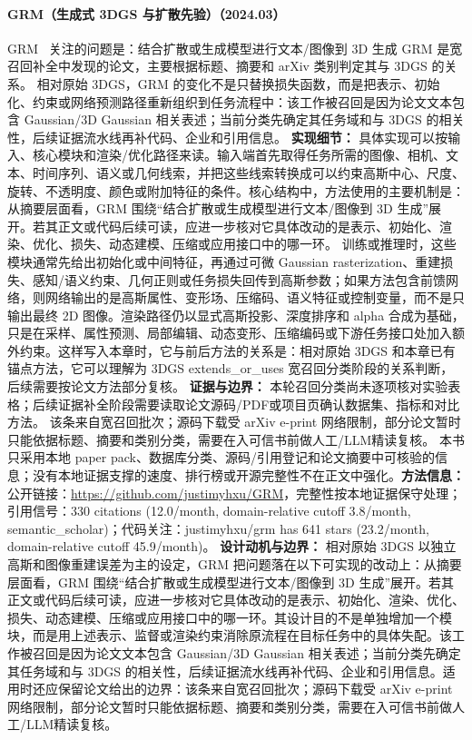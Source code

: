 \paragraph{GRM（生成式 3DGS 与扩散先验）（2024.03）}
GRM~\cite{2403_14621} 关注的问题是：结合扩散或生成模型进行文本/图像到 3D 生成 GRM 是宽召回补全中发现的论文，主要根据标题、摘要和 arXiv 类别判定其与 3DGS 的关系。
相对原始 3DGS，GRM 的变化不是只替换损失函数，而是把表示、初始化、约束或网络预测路径重新组织到任务流程中：该工作被召回是因为论文文本包含 Gaussian/3D Gaussian 相关表述；当前分类先确定其任务域和与 3DGS 的相关性，后续证据流水线再补代码、企业和引用信息。
\textbf{实现细节：} 具体实现可以按输入、核心模块和渲染/优化路径来读。输入端首先取得任务所需的图像、相机、文本、时间序列、语义或几何线索，并把这些线索转换成可以约束高斯中心、尺度、旋转、不透明度、颜色或附加特征的条件。核心结构中，方法使用的主要机制是：从摘要层面看，GRM 围绕“结合扩散或生成模型进行文本/图像到 3D 生成”展开。若其正文或代码后续可读，应进一步核对它具体改动的是表示、初始化、渲染、优化、损失、动态建模、压缩或应用接口中的哪一环。 训练或推理时，这些模块通常先给出初始化或中间特征，再通过可微 Gaussian rasterization、重建损失、感知/语义约束、几何正则或任务损失回传到高斯参数；如果方法包含前馈网络，则网络输出的是高斯属性、变形场、压缩码、语义特征或控制变量，而不是只输出最终 2D 图像。渲染路径仍以显式高斯投影、深度排序和 alpha 合成为基础，只是在采样、属性预测、局部编辑、动态变形、压缩编码或下游任务接口处加入额外约束。这样写入本章时，它与前后方法的关系是：相对原始 3DGS 和本章已有锚点方法，它可以理解为 3DGS extends\_or\_uses 宽召回分类阶段的关系判断，后续需要按论文方法部分复核。
\textbf{证据与边界：} 本轮召回分类尚未逐项核对实验表格；后续证据补全阶段需要读取论文源码/PDF或项目页确认数据集、指标和对比方法。 该条来自宽召回批次；源码下载受 arXiv e-print 网络限制，部分论文暂时只能依据标题、摘要和类别分类，需要在入可信书前做人工/LLM精读复核。 本书只采用本地 paper pack、数据库分类、源码/引用登记和论文摘要中可核验的信息；没有本地证据支撑的速度、排行榜或开源完整性不在正文中强化。\textbf{方法信息：} 公开链接：\url{https://github.com/justimyhxu/GRM}，完整性按本地证据保守处理；引用信号：330 citations (12.0/month, domain-relative cutoff 3.8/month, semantic\_scholar)；代码关注：justimyhxu/grm has 641 stars (23.2/month, domain-relative cutoff 45.9/month)。
\textbf{设计动机与边界：} 相对原始 3DGS 以独立高斯和图像重建误差为主的设定，GRM 把问题落在以下可实现的改动上：从摘要层面看，GRM 围绕“结合扩散或生成模型进行文本/图像到 3D 生成”展开。若其正文或代码后续可读，应进一步核对它具体改动的是表示、初始化、渲染、优化、损失、动态建模、压缩或应用接口中的哪一环。其设计目的不是单独增加一个模块，而是用上述表示、监督或渲染约束消除原流程在目标任务中的具体失配。该工作被召回是因为论文文本包含 Gaussian/3D Gaussian 相关表述；当前分类先确定其任务域和与 3DGS 的相关性，后续证据流水线再补代码、企业和引用信息。适用时还应保留论文给出的边界：该条来自宽召回批次；源码下载受 arXiv e-print 网络限制，部分论文暂时只能依据标题、摘要和类别分类，需要在入可信书前做人工/LLM精读复核。
